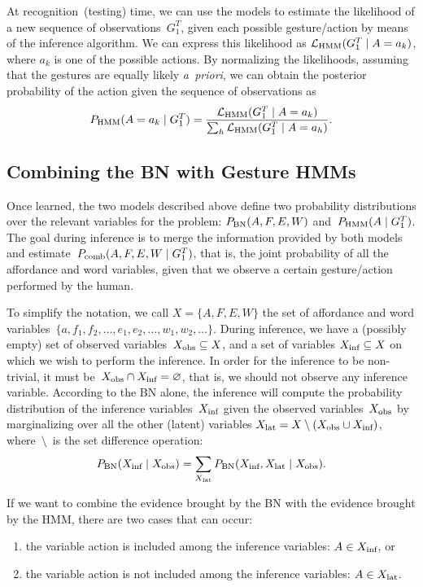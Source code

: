 At recognition~(testing) time, we can use the models to estimate the likelihood of a new sequence of observations~$G_1^T$, given each possible gesture/action by means of the \FB{} inference algorithm.
We can express this likelihood as $\mathcal{L}_\text{HMM}(G_1^T \mid A=a_k)$, where $a_k$ is one of the possible actions.
By normalizing the likelihoods, assuming that the gestures are equally likely \emph{a~priori}, we can obtain the posterior probability of the action given the sequence of observations as
\begin{equation} \label{eq:phmm_action}
  \phmm(A=a_k \given G_1^T) = \frac{\mathcal{L}_\text{HMM}(G_1^T \given A=a_k)}{\sum_h \mathcal{L}_\text{HMM}(G_1^T \given A=a_h)}.
\end{equation}

\subsection{Combining the \acs{BN} with Gesture \acsp{HMM}}
\label{sec:combination}
Once learned, the two models described above define two probability distributions over the relevant variables for the problem:
$P_{\text{BN}}(A, F, E, W)$ and~$P_{\text{HMM}}(A \mid G_1^T)$.
The goal during inference is to merge the information provided by both models and estimate~$P_\text{comb}(A, F, E, W \mid G_1^T)$, that is, the joint probability of all the affordance and word variables, given that we observe a certain gesture/action performed by the human.

To simplify the notation, we call $X = \{A, F, E, W\}$ the set of affordance and word variables~$\{a, f_1, f_2, \dots, e_1, e_2, \dots, w_1, w_2, \dots\}$.
During inference, we have a (possibly empty) set of observed variables~$X_\text{obs} \subseteq X$, and a set of variables $X_\text{inf} \subseteq X$ on which we wish to perform the inference.
In order for the inference to be non-trivial, it must be~$X_\text{obs} \cap X_\text{inf} = \varnothing$, that is, we should not observe any inference variable.
According to the \ac{BN} alone, the inference will compute the probability distribution of the inference variables~$X_\text{inf}$ given the observed variables~$X_\text{obs}$ by marginalizing over all the other (latent) variables $X_\text{lat} = X \setminus (X_\text{obs} \cup X_\text{inf})$, where~$\setminus$~is the set difference operation:
\begin{equation*}
 P_{\text{BN}}(X_\text{inf} \mid X_\text{obs}) = \sum_{X_\text{lat}} P_{\text{BN}}(X_\text{inf}, X_\text{lat} \mid X_\text{obs}).
\end{equation*}

If we want to combine the evidence brought by the \ac{BN} with the evidence brought by the \ac{HMM}, there are two cases that can occur:
\begin{enumerate}
\item the variable action is included among the inference variables: $A \in X_\text{inf}$, or

\item the variable action is not included among the inference variables: $A \in X_\text{lat}$.
\end{enumerate}


